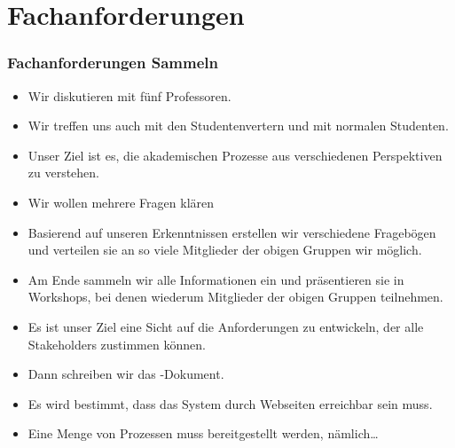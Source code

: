 \documentclass[aspectratio=169,mathserif,notheorems]{beamer}%
\begin{document}
\section{Fachanforderungen}%
%
\begin{frame}%
\frametitle{Fachanforderungen Sammeln}%
\begin{itemize}%
%
%
%
%
%
%
\item<4-> Wir diskutieren mit fünf Professoren.%
%
\item<5-> Wir treffen uns auch mit den Studentenvertern und mit normalen Studenten.%
%
\item<6-> Unser Ziel ist es, die akademischen Prozesse aus verschiedenen Perspektiven zu verstehen.%
%
\item<7-> Wir wollen mehrere Fragen klären%
%
\item<10-> Basierend auf unseren Erkenntnissen erstellen wir verschiedene Fragebögen und verteilen sie an so viele Mitglieder der obigen Gruppen wir möglich.%
%
\item<11-> Am Ende sammeln wir alle Informationen ein und präsentieren sie in Workshops, bei denen wiederum Mitglieder der obigen Gruppen teilnehmen.%
%
\item<12-> Es ist unser Ziel eine Sicht auf die Anforderungen zu entwickeln, der alle Stakeholders zustimmen können.%
%
\item<13-> Dann schreiben wir das -Dokument.%
%
\item<14-> Es wird bestimmt, dass das System durch Webseiten erreichbar sein muss.%
%
\item<15-> Eine Menge von Prozessen muss bereitgestellt werden, nämlich\dots%
\end{itemize}%
\end{frame}%
%
\end{document}
